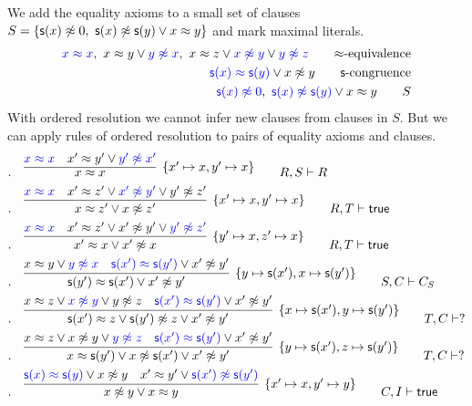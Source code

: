 \begin{example} 
	We add the equality axioms to a small set of clauses
	$S = \{ {\mathsf s}(x)\not\approx 0,\ {\mathsf s}(x)\not\approx{\mathsf s}(y)\lor x\approx y \}$ and mark maximal literals.
	\begin{align*}
	{\colN x \mEQ x},\
	x \mEQ y \lor {\colN y \mNE x},\
	x \mEQ z \lor {\colN x \mNE y} \lor {\colN y\mNE z}
\tag*{$\mEQ$-equivalence}
\\
	{\colN \msucc(x) \mEQ \msucc(y)} \lor x\mNE y
	\tag*{$\msucc$-congruence}
\\
	{\colN \msucc(x)\mNE 0},\
	{\colN \msucc(x) \mNE \msucc(y)} \lor x \mEQ y
\tag*{$S$}
	\end{align*} 
	With ordered resolution we cannot infer new clauses from clauses in $S$.
	But we can apply rules of ordered resolution to pairs of equality axioms and clauses.
	\begin{align*}
.\quad&
\infer[\{x'\mapsto x, y'\mapsto x\}]
{x \mEQ x}
{{\colN x \mEQ x} & x' \mEQ y' \lor {\colN y' \mNE x'}}
\tag*{$R,S\proves R$}
\\
.\quad&
\infer[\{x'\mapsto x,y'\mapsto x \}]
{x\mEQ z'\lor x\mNE z'  }
{{\colN x \mEQ x} & x' \mEQ z' \lor {\colN x' \mNE y'} \lor {y'\mNE z'}}
\tag*{$R,T\proves\true$}
\\
.\quad&
\infer[\{y'\mapsto x, z'\mapsto x \}]
{x'\mEQ x\lor x'\mNE x  }
{{\colN x \mEQ x} & x' \mEQ z' \lor {x' \mNE y'} \lor {\colN y'\mNE z'}}
\tag*{$R,T\proves\true$}
\\
.\quad&
\infer[\{y\mapsto \msucc(x'), x\mapsto\msucc(y')\}]
{\msucc(y')\mEQ\msucc(x')\lor x'\mNE y'}
{x \mEQ y \lor {\colN y \mNE x} & {\colN \msucc(x') \mEQ \msucc(y')} \lor x'\mNE y'} 
\tag*{$S,C\proves C_S$}
\\
.\quad&
\infer[\{x\mapsto\msucc(x'),y\mapsto\msucc(y')\}]
{\msucc(x')\mEQ z\lor \msucc(y')\mNE z \lor x'\mNE y'}
{x \mEQ z \lor {\colN x \mNE y} \lor {y\mNE z} & {\colN \msucc(x') \mEQ \msucc(y')} \lor x'\mNE y'} 
\tag*{$T,C\proves ?$}
\\
.\quad&
\infer[\{y\mapsto\msucc(x'),z\mapsto\msucc(y')\}]
{x\mEQ\msucc(y')\lor x\mNE\msucc(x')\lor x'\mNE y'}
{x \mEQ z \lor {x \mNE y} \lor {\colN y\mNE z} & {\colN \msucc(x') \mEQ \msucc(y')} \lor x'\mNE y'} 
\tag*{$T,C\proves ?$}
\\
.\quad&
\infer[\{x'\mapsto x, y'\mapsto y\}]
{x\mNE y\lor x\mEQ y}
{{\colN \msucc(x) \mEQ \msucc(y)} \lor x\mNE y & x' \mEQ y' \lor {\colN \msucc(x') \mNE \msucc(y')}} 
\tag*{$C,I\proves\true$}
\\
	\end{align*}
\end{example}

